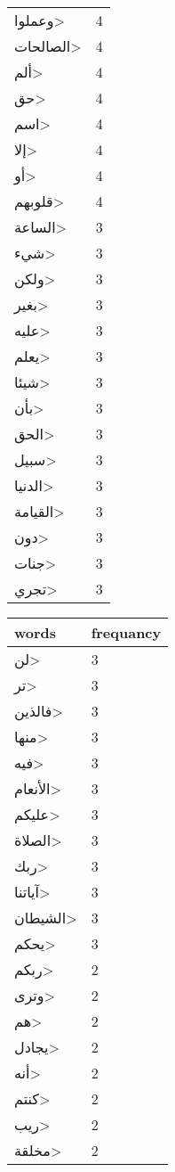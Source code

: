 \documentclass{article}
\begin{document}
\begin{multicols}{3}
\begin{center}
\begin{tabular}{ P{2cm}  P{1cm}}
\<وعملوا> & 4 \\ 
\<الصالحات> & 4 \\ 
\<ألم> & 4 \\ 
\<حق> & 4 \\ 
\<اسم> & 4 \\ 
\<إلا> & 4 \\ 
\<أو> & 4 \\ 
\<قلوبهم> & 4 \\ 
\<الساعة> & 3 \\ 
\<شيء> & 3 \\ 
\<ولكن> & 3 \\ 
\<بغير> & 3 \\ 
\<عليه> & 3 \\ 
\<يعلم> & 3 \\ 
\<شيئا> & 3 \\ 
\<بأن> & 3 \\ 
\<الحق> & 3 \\ 
\<سبيل> & 3 \\ 
\<الدنيا> & 3 \\ 
\<القيامة> & 3 \\ 
\<دون> & 3 \\ 
\<جنات> & 3 \\ 
\<تجري> & 3 \\ 
\end{tabular} 
\begin{tabular}{ P{2cm}  P{1cm}} 
\textbf{words}    & \textbf{frequancy}  \\
\hline
\<لن> & 3 \\ 
\<تر> & 3 \\ 
\<فالذين> & 3 \\ 
\<منها> & 3 \\ 
\<فيه> & 3 \\ 
\<الأنعام> & 3 \\ 
\<عليكم> & 3 \\ 
\<الصلاة> & 3 \\ 
\<ربك> & 3 \\ 
\<آياتنا> & 3 \\ 
\<الشيطان> & 3 \\ 
\<يحكم> & 3 \\ 
\<ربكم> & 2 \\ 
\<وترى> & 2 \\ 
\<هم> & 2 \\ 
\<يجادل> & 2 \\ 
\<أنه> & 2 \\ 
\<كنتم> & 2 \\ 
\<ريب> & 2 \\ 
\<مخلقة> & 2 \\ 

\end{tabular}
\end{center}
\end{multicols}
\end{document}
